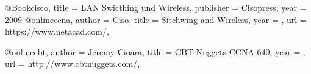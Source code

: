 @Book{cisco,
title = {LAN Swicthing und Wireless},
publisher = {Cisopress},
year = {2009}
}
@online{ccna,
author = {Ciso},
title = {Sitchwing and Wireless},
year = {},
url = {https://www.netacad.com/},
}

@online{cbt,
author = {Jeremy Cioara},
title = {CBT Nuggets CCNA 640},
year = {},
url = {http://www.cbtnuggets.com/},
}

